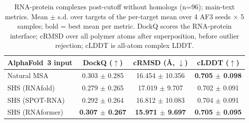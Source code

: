 \begin{table}[htbp]
\centering
\caption{RNA-protein complexes post-cutoff without homologs (n=96); main-text metrics. Mean $\pm$ s.d. over targets of the per-target mean over 4 AF3 seeds $\times$ 5 samples; bold = best mean per metric. DockQ scores the RNA-protein interface; cRMSD over all polymer atoms after superposition, before outlier rejection; cLDDT is all-atom complex LDDT.}
\label{tab:rna_protein_complexes_post_cutoff_without_homologs_reduced}
\begin{tabular}{lccc}
\toprule
AlphaFold~3 input & DockQ ($\uparrow$) & cRMSD (\AA, $\downarrow$) & cLDDT ($\uparrow$) \\
\midrule
Natural MSA & 0.303 $\pm$ 0.285 & 16.454 $\pm$ 10.356 & \textbf{0.705 $\pm$ 0.098} \\
SHS (RNAfold) & 0.279 $\pm$ 0.265 & 17.019 $\pm$ 9.707 & 0.702 $\pm$ 0.091 \\
SHS (SPOT-RNA) & 0.292 $\pm$ 0.264 & 16.812 $\pm$ 10.083 & 0.704 $\pm$ 0.091 \\
SHS (RNAformer) & \textbf{0.307 $\pm$ 0.267} & \textbf{15.971 $\pm$ 9.697} & \textbf{0.705 $\pm$ 0.095} \\
\bottomrule
\end{tabular}
\end{table}

